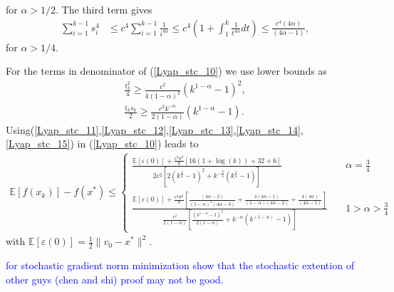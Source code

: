 \documentclass{article}
\newcommand{\hcm}[1]{\textcolor{blue}{#1}}
\theoremstyle{plain}
\theoremstyle{definition}
\theoremstyle{remark}
\begin{document}
         for $\alpha > 1/2$. The third term gives
        \begin{align}\label{Lyap_stc_14}
            \sum_{i=1}^{k-1} s_i^4&\leq c^4\sum_{i=1}^{k-1} \frac{1}{i^{4\alpha }}\leq c^4(1+\int_1^k\frac{1}{t^{4\alpha }}dt)\leq \frac{c^4(4\alpha )}{(4\alpha -1)},
         \end{align} 
         for $\alpha > 1/4$.\par
         For the terms in denominator of (\ref{Lyap_stc_10}) we use lower bounds as
         \begin{align}\label{Lyap_stc_15}
             \frac{t_k^2}{4}\geq \frac{c^2}{4(1-\alpha)^2}(k^{1-\alpha}-1)^2,\nonumber\\
             \frac{t_ks_k}{2}\geq \frac{c^2k^{-\alpha}}{2(1-\alpha)}(k^{1-\alpha}-1).
         \end{align}
Using(\ref{Lyap_stc_11},\ref{Lyap_stc_12},\ref{Lyap_stc_13},\ref{Lyap_stc_14},\ref{Lyap_stc_15}) in (\ref{Lyap_stc_10}) leads to
\begin{align}\label{Lyap_stc_16}
    \mathbb E[f(x_k)]-f(x^*)\leq \left\{\begin{array}{lr}
         \frac{\mathbb E[\varepsilon (0)]+\frac{c^4\sigma^2}{8}\left[16(1+\log(k))+32+6\right]}{2c^2\left[2(k^{\frac{1}{4}}-1)^2+k^{-\frac{3}{4}}(k^{\frac{1}{4}}-1)\right]} & \quad \alpha=\frac{3}{4} \\
          \frac{\mathbb E[\varepsilon (0)]+\frac{c^4\sigma^2}{8}\left[\frac{(4\alpha -2)}{(1-\alpha)^2(4\alpha-3)}+\frac{4(4\alpha -1)}{(1-\alpha)(4\alpha -2)}+\frac{4(4\alpha )}{(4\alpha -1)}\right]}{\frac{c^2}{2(1-\alpha)}\left[\frac{(k^{1-\alpha}-1)^2}{2(1-\alpha)}+k^{-\alpha}(k^{(1-\alpha)}-1)\right]}& \quad 1>\alpha>\frac{3}{4}
    \end{array}\right.
\end{align}
with $\mathbb E[\varepsilon (0)]=\frac{1}{2}\|v_0-x^*\|^2$. 


\hcm{for stochastic gradient norm minimization show that the stochastic extention of other guys (chen and shi) proof may not be good.}
\end{document}
